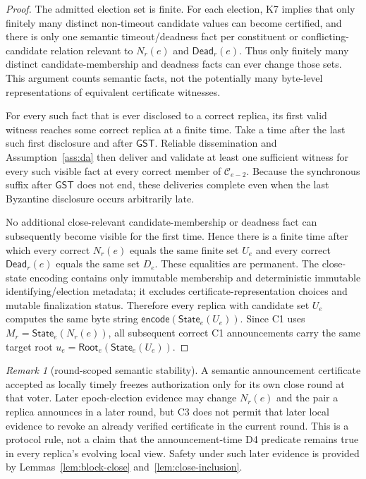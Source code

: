 \documentclass[11pt]{article}
\theoremstyle{definition}
\theoremstyle{remark}
\newtheorem{remark}[theorem]{Remark}
\newcommand{\C}{\mathcal C}
\newcommand{\GST}{\mathsf{GST}}
\newcommand{\Root}{\mathsf{Root}}
\newcommand{\State}{\mathsf{State}}
\newcommand{\Dead}{\mathsf{Dead}}
\begin{document}
\begin{proof}
The admitted election set is finite. For each election, K7 implies that only finitely many distinct non-timeout candidate values can become certified, and there is only one semantic timeout/deadness fact per constituent or conflicting-candidate relation relevant to $N_r(e)$ and $\Dead_r(e)$. Thus only finitely many distinct candidate-membership and deadness facts can ever change those sets. This argument counts semantic facts, not the potentially many byte-level representations of equivalent certificate witnesses.

For every such fact that is ever disclosed to a correct replica, its first valid witness reaches some correct replica at a finite time. Take a time after the last such first disclosure and after $\GST$. Reliable dissemination and Assumption~\ref{ass:da} then deliver and validate at least one sufficient witness for every such visible fact at every correct member of $\C_{e-2}$. Because the synchronous suffix after $\GST$ does not end, these deliveries complete even when the last Byzantine disclosure occurs arbitrarily late.

No additional close-relevant candidate-membership or deadness fact can subsequently become visible for the first time. Hence there is a finite time after which every correct $N_r(e)$ equals the same finite set $U_e$ and every correct $\Dead_r(e)$ equals the same set $D_e$. These equalities are permanent. The close-state encoding contains only immutable membership and deterministic immutable identifying/election metadata; it excludes certificate-representation choices and mutable finalization status. Therefore every replica with candidate set $U_e$ computes the same byte string $\mathsf{encode}(\State_e(U_e))$. Since C1 uses $M_r=\State_e(N_r(e))$, all subsequent correct C1 announcements carry the same target root $u_e=\Root_e(\State_e(U_e))$.
\end{proof}

\begin{remark}[round-scoped semantic stability]
A semantic announcement certificate accepted as locally timely freezes authorization only for its own close round at that voter. Later epoch-election evidence may change $N_r(e)$ and the pair a replica announces in a later round, but C3 does not permit that later local evidence to revoke an already verified certificate in the current round. This is a protocol rule, not a claim that the announcement-time D4 predicate remains true in every replica's evolving local view. Safety under such later evidence is provided by Lemmas~\ref{lem:block-close} and~\ref{lem:close-inclusion}.
\end{remark}
\end{document}
